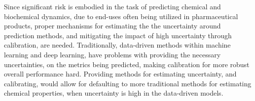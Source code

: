 Since significant risk is embodied in the task of predicting chemical and biochemical dynamics, due to end-uses often being
utilized in pharmaceutical products, proper mechanisms for estimating the the uncertainty around prediction methods, and
mitigating the impact of high uncertainty through calibration, are needed. Traditionally, data-driven methods within machine
learning and deep learning, have problems with providing the necessary uncertainties, on the metrics being predicted, making
calibration for more robust overall performance hard\cite{Song2019}\cite{Busk2021}\cite{AleatoricAndEpistemic}.
Providing methods for estimating uncertainty, and calibrating, would allow for defaulting to more traditional methods
for estimating chemical properties, when uncertainty is high in the data-driven models\cite{Busk2021}. \\


